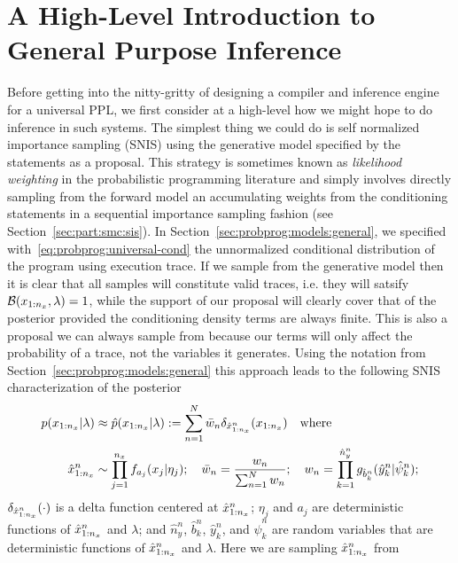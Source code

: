 
\section{A High-Level Introduction to General Purpose Inference}
\label{sec:proginf:high}

Before getting into the nitty-gritty of designing a compiler and inference engine for a universal PPL, we
first consider at a high-level how we might hope to do inference in such systems.  The simplest
thing we could do is self normalized importance sampling (SNIS) using the generative model specified by the \sample
statements as a proposal.  This strategy is sometimes known as \emph{likelihood weighting} in the probabilistic
programming literature and simply involves directly sampling from the forward model an accumulating
weights from the \observe conditioning statements in a sequential importance sampling fashion (see 
Section~\ref{sec:part:smc:sis}).
In Section~\ref{sec:probprog:models:general}, we specified with~\eqref{eq:probprog:universal-cond}
the unnormalized conditional distribution of the program using execution trace.  
If we sample from the generative model then it is clear that all samples will constitute valid
traces, i.e. they will satsify
$\mathcal{B}(x_{1:n_x},\lambda)=1$, while  the support of our proposal will clearly cover that of
the posterior provided the conditioning density terms are always finite.  This is also a proposal
we can always sample from because our \observe terms will only affect the probability of a trace, not
the variables it generates.  Using the notation from Section~\ref{sec:probprog:models:general} 
this approach leads to the following SNIS characterization of the posterior
\begin{align}
p(x_{1:n_x} | \lambda) &\approx \hat{p}(x_{1:n_x} | \lambda) := \sum_{n=1}^{N} \bar w_n \delta_{\hat{x}_{1:n_x}^n} (x_{1:n_x})
\quad \text{where}  \\
\hat{x}_{1:n_x}^n &\sim \prod_{j=1}^{n_x} f_{a_j}(x_j | \eta_j); \quad \bar w_n = \frac{w_n}{\sum_{n=1}^{N} w_n}; \quad
w_n = \prod_{k=1}^{\hat{n}_{y}^n} g_{\hat{b}_{k}^n}(\hat{y}_{k}^n | \hat{\psi}_{k}^n);
\end{align}
$\delta_{\hat{x}_{1:n_x}^n} (\cdot)$ is a delta function centered at $\hat{x}_{1:n_x}^n$; $\eta_j$ and $a_j$ are deterministic functions of $\hat{x}_{1:n_x}^n$ 
and $\lambda$; and $\hat{n}_{y}^n$, $\hat{b}_{k}^n$, $\hat{y}_{k}^n$, and $\hat{\psi}_{k}^n$ are random variables
that are deterministic functions of $\hat{x}_{1:n_x}^n$ and $\lambda$.  Here we are sampling $\hat{x}_{1:n_x}^n$ from
